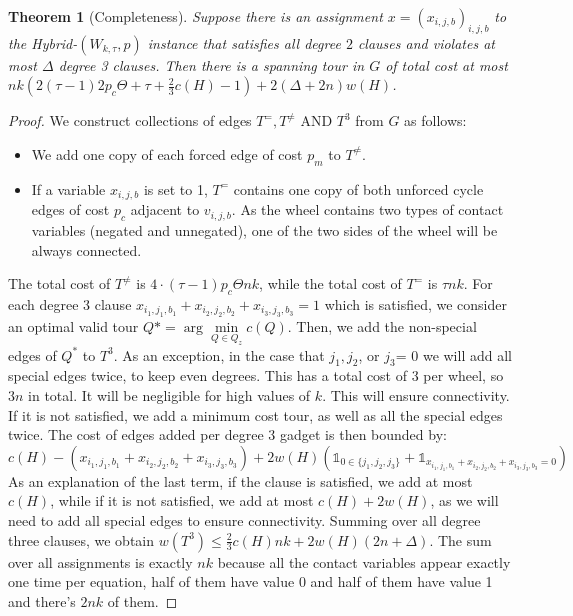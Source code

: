 \documentclass[12pt]{article}
\newtheorem{theorem}{Theorem}
\begin{document}
\begin{theorem}[Completeness]\label{completeness}
Suppose there is an assignment $x= {(x_{i,j,b})}_{i,j,b}$ to the Hybrid-$(W_{k,\tau},p)$ instance that satisfies all degree $2$  clauses and violates at most $\Delta$ degree 3 clauses. 
Then there is a spanning tour in $G$ of total cost at most $nk(2 (\tau-1)2p_c\Theta+\tau+\frac{2}{3}c(H)-1)+ 2(\Delta+2n)w(H)$.
\end{theorem}
\begin{proof}
    We construct collections of edges $T^=, T^{\not =}$ AND $T^3$ from $G$ as follows:
    \begin{itemize}
        \item We add one copy of each forced edge of cost $p_m$ to $T^{\not =}$. 
        \item If a variable $x_{i,j,b}$ is set to 1, $T^=$ contains one copy of both unforced cycle edges of cost $p_c$ adjacent to $v_{i,j,b}$.
        As the wheel contains two types of contact variables (negated and unnegated), one of the two sides of the wheel will be always connected.
    \end{itemize}
    The total cost of $T^{\not =}$ is $4\cdot(\tau-1)p_c\Theta nk$, while the total cost of $T^=$ is $\tau nk$.
    For each degree 3 clause $x_{i_1,j_1,b_1}+x_{i_2,j_2,b_2}+x_{i_3,j_3,b_3}=1$ which is satisfied, we consider an optimal valid tour $Q*= \arg \min\limits_{Q \in Q_z} c(Q)$. Then, we add the non-special edges of $Q^*$ to $T^3$. 
    As an exception, in the case that $j_1,j_2$, or $j_3$= 0 we will add all special edges twice, to keep even degrees. This has a total cost of 3 per wheel, so $3n$ in total. It will be negligible for high values of $k$.
    This will ensure connectivity. If it is not satisfied, we add a minimum cost tour, as well as all the special edges twice. 
    The cost of edges added per degree 3 gadget is then bounded by: 
    \[c(H)-(x_{i_1,j_1,b_1}+x_{i_2,j_2,b_2}+x_{i_3,j_3,b_3})+2w(H)(\mathds{1}_{0\in \{j_1,j_2,j_3\}}+\mathds{1}_{x_{i_1,j_1,b_1}+x_{i_2,j_2,b_2}+x_{i_3,j_3,b_3}=0})\]
    As an explanation of the last term, if the clause is satisfied, we add at most $c(H)$, while if it is not satisfied, we add at most $c(H)+2w(H)$, as we will need to add all special edges to ensure connectivity.
    Summing over all degree three clauses, we obtain $w(T^3)\leq \frac{2}{3}c(H)nk+2w(H) (2n+\Delta)$.
    The sum over all assignments is exactly $nk$ because all the contact variables appear exactly one time per equation, half of them have value 0 and half of them have value 1 and there's $2nk$ of them. 

\end{proof}
\end{document}
